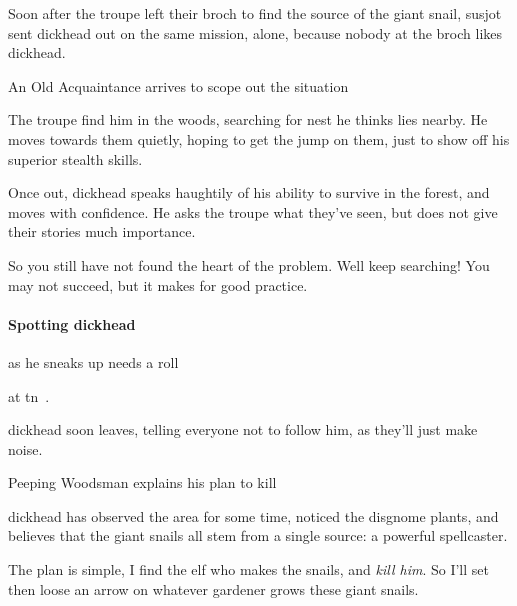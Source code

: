 \begin{multicols}{2}


\noindent
Soon after the troupe left their \gls{broch} to find the source of the giant snail, \gls{susjot} sent \gls{dickhead} out on the same mission, alone, because nobody at the \gls{broch} likes \gls{dickhead}.

{An Old Acquaintance}%
{ arrives to scope out the situation}%

The troupe find him in the woods, searching for  nest he thinks lies nearby.
He moves towards them quietly, hoping to get the jump on them, just to show off his superior stealth \glspl{skill}.

Once out, \gls{dickhead} speaks haughtily of his ability to survive in the forest, and moves with confidence.
He asks the troupe what they've seen, but does not give their stories much importance.

\begin{speechtext}
  So you still have not found the heart of the problem.
  Well keep searching!
  You may not succeed, but it makes for good practice.
\end{speechtext}

\dickhead

\paragraph{Spotting \gls{dickhead}}
as he sneaks up needs a  roll
%
\addtocounter{track}{\value{Dexterity}}%
\addtocounter{track}{\value{Stealth}}%
at \gls{tn}~.

\Gls{dickhead} soon leaves, telling everyone not to follow him, as they'll just make noise.

{Peeping Woodsman}%
{ explains his plan to kill }%

\Gls{dickhead} has observed the area for some time, noticed the \gls{disgnome} plants, and believes that the giant snails all stem from a single source: a powerful spellcaster.

\begin{speechtext}
  The plan is simple, I find the elf who makes the snails, and \emph{kill him}.
  So I'll set  then loose an arrow on whatever gardener grows these giant snails.


\end{speechtext}
\end{multicols}
